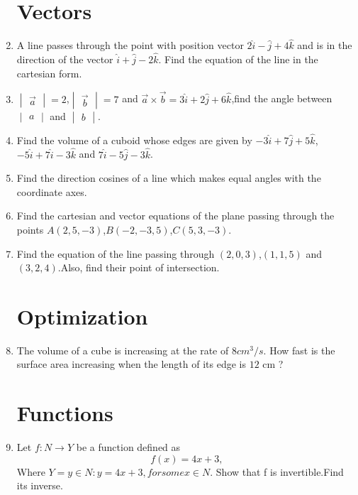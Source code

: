 \documentclass[2pt,-letter paper]{article}
\providecommand{\mydet}[1]{\ensuremath{\begin{vmatrix}#1\end{vmatrix}}}
\providecommand{\brak}[1]{\ensuremath{\left(#1\right)}}
\begin{document}
\begin{enumerate}
\section{Vectors}
\item A line passes through the point with position vector $2\hat{i} - \hat{j} + 4\hat{k}$ and is in the direction of the vector $\hat{i} + \hat{j} -2\hat{k}.$ Find the equation of the line in the cartesian form.
\item $\mydet{\overrightarrow{a}}= 2$,$\mydet{\overrightarrow{b}} = 7$ and  $\overrightarrow{a} \times \overrightarrow{b} = 3\hat{i} + 2\hat{j} + 6\hat{k}$,find the angle between $\mydet{a}$ and $\mydet{b}$.
\item Find the volume of a cuboid whose edges are given by $-3\hat{i} + 7\hat{j} + 5\hat{k}$, $-5\hat{i} + 7\hat{i} - 3\hat{k}$ and $7\hat{i} -5\hat{j} -3\hat{k}$.
\item Find the direction cosines of a line which makes equal angles with the coordinate axes.
\item Find the cartesian and vector equations of the plane passing through the points $A\brak{2,5,-3}$,$B\brak{-2,-3,5}$,$C\brak{5,3,-3}$.
\item Find the equation of the line passing through $\brak{2, 0, 3}$,$\brak{1, 1, 5}$ and $\brak{3, 2, 4}$.Also, find their point of intersection.
\section{Optimization}
\item The volume of a cube is increasing at the rate of $8 cm^3/s$. How fast is the surface area increasing when the length of its edge is $12$ cm ?
\section{Functions}
\item Let $f : N \rightarrow Y$ be a function defined as 
\begin{equation}
 f(x) = 4x + 3,
\end{equation}
Where $Y = {y \in N : y = 4x + 3, for some x \in N}$. Show that f is invertible.Find its inverse.

\end{enumerate}
\end{document}
